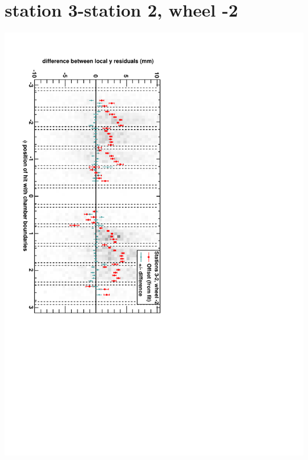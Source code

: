 \documentclass[compress]{beamer}
\begin{document}
\section*{station 3-station 2, wheel -2}
\begin{frame} \vfill \mbox{\hspace{-1 cm}\includegraphics[height=1.2\linewidth, angle=90]{DTzdiff23VsPhi_whA_slope.pdf}} \end{frame}
\end{document}
